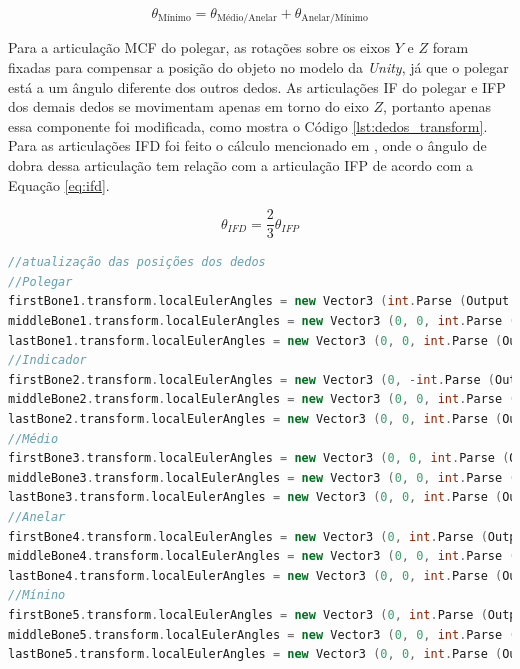 \begin{equation}\label{eq:minimo}
    \theta_{\text{Mínimo}} = \theta_{\text{Médio/Anelar}}+\theta_{\text{Anelar/Mínimo}}
\end{equation}


Para a articulação \ac{MCF} do polegar, as rotações sobre os eixos $Y$ e $Z$ foram fixadas para compensar a posição do objeto no modelo da \textit{Unity}, já que o polegar está a um ângulo diferente dos outros dedos. As articulações \ac{IF} do polegar e \ac{IFP} dos demais dedos se movimentam apenas em torno do eixo $Z$, portanto apenas essa componente foi modificada, como mostra o Código \ref{lst:dedos_transform}. Para as articulações \ac{IFD} foi feito o cálculo mencionado em , onde o ângulo de dobra dessa articulação tem relação com a articulação \ac{IFP} de acordo com a Equação \ref{eq:ifd}.

\begin{equation}\label{eq:ifd}
    \theta_{IFD} = \frac{2}{3} \theta_{IFP}
\end{equation}

\begin{lstlisting}[language=C++,label=lst:dedos_transform,caption={Transformações dos dedos},morekeywords={SerialPort,IsOpen,Close,Open,Quaternion,GameObject,Vector3,Split,transform,localEulerAngles,Parse,Set,eulerAngles}]
//atualização das posições dos dedos
//Polegar
firstBone1.transform.localEulerAngles = new Vector3 (int.Parse (Output [10])-50, 225, 90);
middleBone1.transform.localEulerAngles = new Vector3 (0, 0, int.Parse (Output [0]));
lastBone1.transform.localEulerAngles = new Vector3 (0, 0, int.Parse (Output [1]));
//Indicador
firstBone2.transform.localEulerAngles = new Vector3 (0, -int.Parse (Output [11]), int.Parse (Output [2]));
middleBone2.transform.localEulerAngles = new Vector3 (0, 0, int.Parse (Output [3]));
lastBone2.transform.localEulerAngles = new Vector3 (0, 0, int.Parse (Output [3]) * 2 / 3);
//Médio
firstBone3.transform.localEulerAngles = new Vector3 (0, 0, int.Parse (Output [4]));
middleBone3.transform.localEulerAngles = new Vector3 (0, 0, int.Parse (Output [5]));
lastBone3.transform.localEulerAngles = new Vector3 (0, 0, int.Parse (Output [5]) * 2 / 3);
//Anelar
firstBone4.transform.localEulerAngles = new Vector3 (0, int.Parse (Output [12]), int.Parse (Output [6]));
middleBone4.transform.localEulerAngles = new Vector3 (0, 0, int.Parse (Output [7]));
lastBone4.transform.localEulerAngles = new Vector3 (0, 0, int.Parse (Output [7]) * 2 / 3);
//Mínino
firstBone5.transform.localEulerAngles = new Vector3 (0, int.Parse (Output [13])+int.Parse (Output [12])-10, int.Parse (Output [8]));
middleBone5.transform.localEulerAngles = new Vector3 (0, 0, int.Parse (Output [9]));
lastBone5.transform.localEulerAngles = new Vector3 (0, 0, int.Parse (Output [9]) * 2 / 3);
\end{lstlisting}

